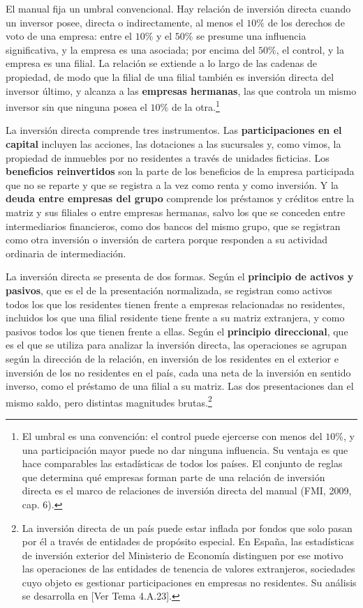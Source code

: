 \documentclass[10pt,a4paper]{article}
\newcommand{\authorfont}[1]{{\fontfamily{EBGaramond-TLF}\selectfont #1}}
\begin{document}
El manual fija un umbral convencional. Hay relación de inversión directa cuando un inversor posee, directa o indirectamente, al menos el $10\%$ de los derechos de voto de una empresa: entre el $10\%$ y el $50\%$ se presume una influencia significativa, y la empresa es una asociada; por encima del $50\%$, el control, y la empresa es una filial. La relación se extiende a lo largo de las cadenas de propiedad, de modo que la filial de una filial también es inversión directa del inversor último, y alcanza a las \textbf{empresas hermanas}, las que controla un mismo inversor sin que ninguna posea el $10\%$ de la otra.\footnote{%
    El umbral es una convención: el control puede ejercerse con menos del $10\%$, y una participación mayor puede no dar ninguna influencia. Su ventaja es que hace comparables las estadísticas de todos los países. El conjunto de reglas que determina qué empresas forman parte de una relación de inversión directa es el marco de relaciones de inversión directa del manual (FMI, 2009, cap. 6).
}

La inversión directa comprende tres instrumentos. Las \textbf{participaciones en el capital} incluyen las acciones, las dotaciones a las sucursales y, como vimos, la propiedad de inmuebles por no residentes a través de unidades ficticias. Los \textbf{beneficios reinvertidos} son la parte de los beneficios de la empresa participada que no se reparte y que se registra a la vez como renta y como inversión. Y la \textbf{deuda entre empresas del grupo} comprende los préstamos y créditos entre la matriz y sus filiales o entre empresas hermanas, salvo los que se conceden entre intermediarios financieros, como dos bancos del mismo grupo, que se registran como otra inversión o inversión de cartera porque responden a su actividad ordinaria de intermediación.

La inversión directa se presenta de dos formas. Según el \textbf{principio de activos y pasivos}, que es el de la presentación normalizada, se registran como activos todos los que los residentes tienen frente a empresas relacionadas no residentes, incluidos los que una filial residente tiene frente a su matriz extranjera, y como pasivos todos los que tienen frente a ellas. Según el \textbf{principio direccional}, que es el que se utiliza para analizar la inversión directa, las operaciones se agrupan según la dirección de la relación, en inversión de los residentes en el exterior e inversión de los no residentes en el país, cada una neta de la inversión en sentido inverso, como el préstamo de una filial a su matriz. Las dos presentaciones dan el mismo saldo, pero distintas magnitudes brutas.\footnote{%
    La inversión directa de un país puede estar inflada por fondos que solo pasan por él a través de entidades de propósito especial. En España, las estadísticas de inversión exterior del Ministerio de Economía distinguen por ese motivo las operaciones de las entidades de tenencia de valores extranjeros, sociedades cuyo objeto es gestionar participaciones en empresas no residentes. Su análisis se desarrolla en [\authorfont{Ver Tema 4.A.23}].
}
\end{document}
